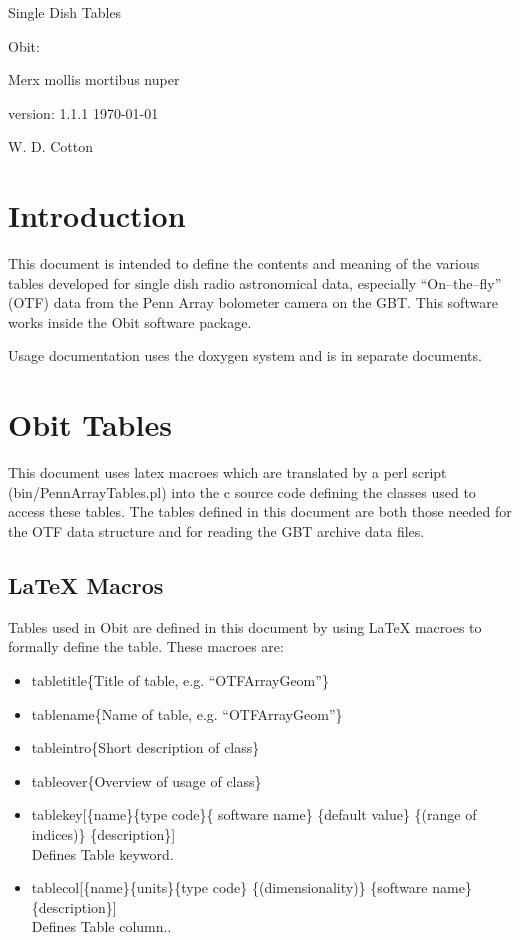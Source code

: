 \documentclass[11pt]{article}
\begin{document}
\setcounter{section}{0}

\vskip 5cm
\centerline{\ttlfont Single Dish Tables}
\vskip 1cm
\centerline{\ttlfont Obit: }
\centerline{\ttlfont Merx mollis mortibus nuper}
\vskip 3cm
\centerline{\secfont version: 1.1.1 \today}
\vskip 1cm
\centerline{\secfont W. D. Cotton}
\clearpage

\tableofcontents
\cleardoublepage

\section {Introduction}
   This document is intended to define the contents and meaning of the
various tables developed for single dish radio astronomical data,
especially ``On--the--fly'' (OTF) data from the Penn Array bolometer
camera on the GBT.
This software works inside the Obit software package.

Usage documentation uses the doxygen system and is in separate
documents.

\section{Obit Tables}
This document uses latex macroes which are translated by a perl
script (bin/PennArrayTables.pl) into the c source code defining the
classes used to access these tables.
The tables defined in this document are both those needed for the OTF
data structure and for reading the GBT archive data files.

\subsection{LaTeX Macros}
Tables used in Obit are defined in this document by using LaTeX
macroes to formally define the table.
These macroes are:
\begin{itemize}
\item tabletitle\{Title of table, e.g. ``OTFArrayGeom''\}
\item tablename\{Name of table, e.g. ``OTFArrayGeom''\}
\item tableintro\{Short description of class\}
\item tableover\{Overview of usage of class\}
\item tablekey[\{name\}\{type code\}\{ software name\} \{default value\}
\{(range of indices)\} \{description\}]\\
Defines Table keyword.
\item tablecol[\{name\}\{units\}\{type code\} \{(dimensionality)\} \{software
name\} \{description\}]\\
Defines Table column..
\end{itemize}
\end{document}
